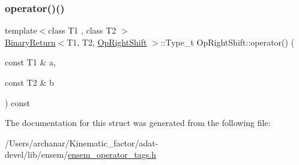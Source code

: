 \subsubsection{\texorpdfstring{operator()()}{operator()()}\hspace{0.1cm}{\footnotesize\ttfamily [3/3]}}
{\footnotesize\ttfamily template$<$class T1 , class T2 $>$ \\
\mbox{\hyperlink{structBinaryReturn}{Binary\+Return}}$<$T1, T2, \mbox{\hyperlink{structOpRightShift}{Op\+Right\+Shift}} $>$\+::Type\+\_\+t Op\+Right\+Shift\+::operator() (\begin{DoxyParamCaption}\item[{const T1 \&}]{a,  }\item[{const T2 \&}]{b }\end{DoxyParamCaption}) const\hspace{0.3cm}{\ttfamily [inline]}}



The documentation for this struct was generated from the following file\+:\begin{DoxyCompactItemize}
\item 
/\+Users/archanar/\+Kinematic\+\_\+factor/adat-\/devel/lib/ensem/\mbox{\hyperlink{adat-devel_2lib_2ensem_2ensem__operator__tags_8h}{ensem\+\_\+operator\+\_\+tags.\+h}}\end{DoxyCompactItemize}
